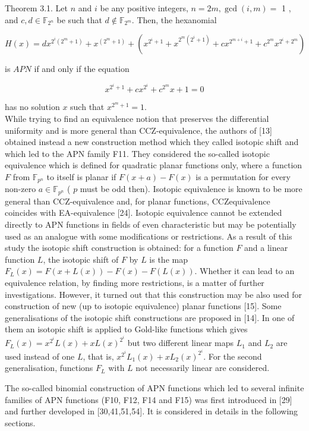 \documentclass[10pt]{article}
\begin{document}
Theorem 3.1. Let $n$ and $i$ be any positive integers, $n=2 m, \operatorname{gcd}(i, m)=$ 1 , and $c, d \in \mathbb{F}_{2^{n}}$ be such that $d \notin \mathbb{F}_{2^{m}}$. Then, the hexanomial

$$
H(x)=d x^{2^{i}\left(2^{m}+1\right)}+x^{\left(2^{m}+1\right)}+\left(x^{2^{i}+1}+x^{2^{m}\left(2^{i}+1\right)}+c x^{2^{m+i}+1}+c^{2^{m}} x^{2^{i}+2^{m}}\right)
$$

is $A P N$ if and only if the equation

$$
x^{2^{i}+1}+c x^{2^{i}}+c^{2^{m}} x+1=0
$$

has no solution $x$ such that $x^{2^{m}+1}=1$.\\[0pt]
While trying to find an equivalence notion that preserves the differential uniformity and is more general than CCZ-equivalence, the authors of [13] obtained instead a new construction method which they called isotopic shift and which led to the APN family F11. They considered the so-called isotopic equivalence which is defined for quadratic planar functions only, where a function $F$ from $\mathbb{F}_{p^{n}}$ to itself is planar if $F(x+a)-F(x)$ is a permutation for every non-zero $a \in \mathbb{F}_{p^{n}}$ ( $p$ must be odd then). Isotopic equivalence is known to be more general than CCZ-equivalence and, for planar functions, CCZequivalence coincides with EA-equivalence [24]. Isotopic equivalence cannot be extended directly to APN functions in fields of even characteristic but may be potentially used as an analogue with some modifications or restrictions. As a result of this study the isotopic shift construction is obtained: for a function $F$ and a linear function $L$, the isotopic shift of $F$ by $L$ is the map $F_{L}(x)=F(x+L(x))-F(x)-F(L(x))$. Whether it can lead to an equivalence relation, by finding more restrictions, is a matter of further investigations. However, it turned out that this construction may be also used for construction of new (up to isotopic equivalence) planar functions [15]. Some generalisations of the isotopic shift constructions are proposed in [14]. In one of them an isotopic shift is applied to Gold-like functions which gives $F_{L}(x)=x^{2^{i}} L(x)+x L(x)^{2^{i}}$ but two different linear maps $L_{1}$ and $L_{2}$ are used instead of one $L$, that is, $x^{2^{i}} L_{1}(x)+x L_{2}(x)^{2^{i}}$. For the second generalisation, functions $F_{L}$ with $L$ not necessarily linear are considered.

The so-called binomial construction of APN functions which led to several infinite families of APN functions (F10, F12, F14 and F15) was first introduced in [29] and further developed in [30,41,51,54]. It is considered in details in the following sections.
\end{document}
